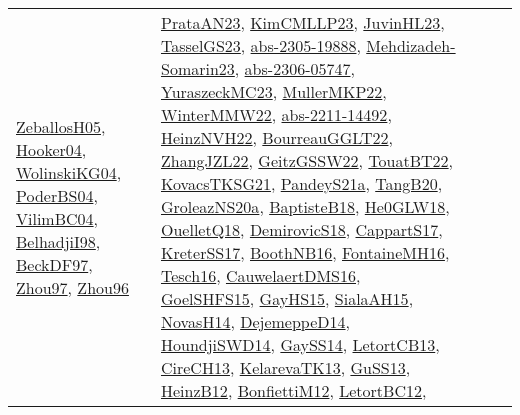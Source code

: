 {\begin{longtable}{lp{3cm}>{\raggedright}p{6cm}>{\raggedright}p{6cm}p{8cm}}
\href{articles/ZeballosH05.pdf}{ZeballosH05}\cite{ZeballosH05}, \href{papers/Hooker04.pdf}{Hooker04}\cite{Hooker04}, \href{papers/WolinskiKG04.pdf}{WolinskiKG04}\cite{WolinskiKG04}, \href{articles/PoderBS04.pdf}{PoderBS04}\cite{PoderBS04}, \href{papers/VilimBC04.pdf}{VilimBC04}\cite{VilimBC04}, \href{articles/BelhadjiI98.pdf}{BelhadjiI98}\cite{BelhadjiI98}, \href{papers/BeckDF97.pdf}{BeckDF97}\cite{BeckDF97}, \href{articles/Zhou97.pdf}{Zhou97}\cite{Zhou97}, \href{papers/Zhou96.pdf}{Zhou96}\cite{Zhou96} & \href{articles/PrataAN23.pdf}{PrataAN23}\cite{PrataAN23}, \href{papers/KimCMLLP23.pdf}{KimCMLLP23}\cite{KimCMLLP23}, \href{papers/JuvinHL23.pdf}{JuvinHL23}\cite{JuvinHL23}, \href{papers/TasselGS23.pdf}{TasselGS23}\cite{TasselGS23}, \href{articles/abs-2305-19888.pdf}{abs-2305-19888}\cite{abs-2305-19888}, \href{papers/Mehdizadeh-Somarin23.pdf}{Mehdizadeh-Somarin23}\cite{Mehdizadeh-Somarin23}, \href{articles/abs-2306-05747.pdf}{abs-2306-05747}\cite{abs-2306-05747}, \href{papers/YuraszeckMC23.pdf}{YuraszeckMC23}\cite{YuraszeckMC23}, \href{articles/MullerMKP22.pdf}{MullerMKP22}\cite{MullerMKP22}, \href{papers/WinterMMW22.pdf}{WinterMMW22}\cite{WinterMMW22}, \href{articles/abs-2211-14492.pdf}{abs-2211-14492}\cite{abs-2211-14492}, \href{articles/HeinzNVH22.pdf}{HeinzNVH22}\cite{HeinzNVH22}, \href{articles/BourreauGGLT22.pdf}{BourreauGGLT22}\cite{BourreauGGLT22}, \href{papers/ZhangJZL22.pdf}{ZhangJZL22}\cite{ZhangJZL22}, \href{papers/GeitzGSSW22.pdf}{GeitzGSSW22}\cite{GeitzGSSW22}, \href{papers/TouatBT22.pdf}{TouatBT22}\cite{TouatBT22}, \href{papers/KovacsTKSG21.pdf}{KovacsTKSG21}\cite{KovacsTKSG21}, \href{articles/PandeyS21a.pdf}{PandeyS21a}\cite{PandeyS21a}, \href{papers/TangB20.pdf}{TangB20}\cite{TangB20}, \href{papers/GroleazNS20a.pdf}{GroleazNS20a}\cite{GroleazNS20a}, \href{articles/BaptisteB18.pdf}{BaptisteB18}\cite{BaptisteB18}, \href{papers/He0GLW18.pdf}{He0GLW18}\cite{He0GLW18}, \href{papers/OuelletQ18.pdf}{OuelletQ18}\cite{OuelletQ18}, \href{papers/DemirovicS18.pdf}{DemirovicS18}\cite{DemirovicS18}, \href{papers/CappartS17.pdf}{CappartS17}\cite{CappartS17}, \href{articles/KreterSS17.pdf}{KreterSS17}\cite{KreterSS17}, \href{papers/BoothNB16.pdf}{BoothNB16}\cite{BoothNB16}, \href{papers/FontaineMH16.pdf}{FontaineMH16}\cite{FontaineMH16}, \href{papers/Tesch16.pdf}{Tesch16}\cite{Tesch16}, \href{papers/CauwelaertDMS16.pdf}{CauwelaertDMS16}\cite{CauwelaertDMS16}, \href{articles/GoelSHFS15.pdf}{GoelSHFS15}\cite{GoelSHFS15}, \href{papers/GayHS15.pdf}{GayHS15}\cite{GayHS15}, \href{papers/SialaAH15.pdf}{SialaAH15}\cite{SialaAH15}, \href{articles/NovasH14.pdf}{NovasH14}\cite{NovasH14}, \href{papers/DejemeppeD14.pdf}{DejemeppeD14}\cite{DejemeppeD14}, \href{papers/HoundjiSWD14.pdf}{HoundjiSWD14}\cite{HoundjiSWD14}, \href{papers/GaySS14.pdf}{GaySS14}\cite{GaySS14}, \href{papers/LetortCB13.pdf}{LetortCB13}\cite{LetortCB13}, \href{papers/CireCH13.pdf}{CireCH13}\cite{CireCH13}, \href{papers/KelarevaTK13.pdf}{KelarevaTK13}\cite{KelarevaTK13}, \href{papers/GuSS13.pdf}{GuSS13}\cite{GuSS13}, \href{papers/HeinzB12.pdf}{HeinzB12}\cite{HeinzB12}, \href{papers/BonfiettiM12.pdf}{BonfiettiM12}\cite{BonfiettiM12}, \href{papers/LetortBC12.pdf}{LetortBC12}\cite{LetortBC12}, 
\end{longtable}}
